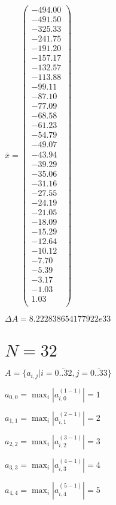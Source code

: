 \documentclass[a4paper,12pt]{article}
\begin{document}
$\bar { x } = \begin{pmatrix}
-494.00 \\
-491.50 \\
-325.33 \\
-241.75 \\
-191.20 \\
-157.17 \\
-132.57 \\
-113.88 \\
-99.11 \\
-87.10 \\
-77.09 \\
-68.58 \\
-61.23 \\
-54.79 \\
-49.07 \\
-43.94 \\
-39.29 \\
-35.06 \\
-31.16 \\
-27.55 \\
-24.19 \\
-21.05 \\
-18.09 \\
-15.29 \\
-12.64 \\
-10.12 \\
-7.70 \\
-5.39 \\
-3.17 \\
-1.03 \\
1.03 \\
\end{pmatrix}
$

$\Delta A = 8.222838654177922e33$



\section{ $N = 32$ }
$A = \{ a _{ i, j } | i = \bar { 0..32 }, j = \bar { 0..33 } \}$

$a _{ 0, 0 } =  \max _i |a _{ i, 0 } ^{ (1 - 1) } | = 1$

$a _{ 1, 1 } =  \max _i |a _{ i, 1 } ^{ (2 - 1) } | = 2$

$a _{ 2, 2 } =  \max _i |a _{ i, 2 } ^{ (3 - 1) } | = 3$

$a _{ 3, 3 } =  \max _i |a _{ i, 3 } ^{ (4 - 1) } | = 4$

$a _{ 4, 4 } =  \max _i |a _{ i, 4 } ^{ (5 - 1) } | = 5$
\end{document}
